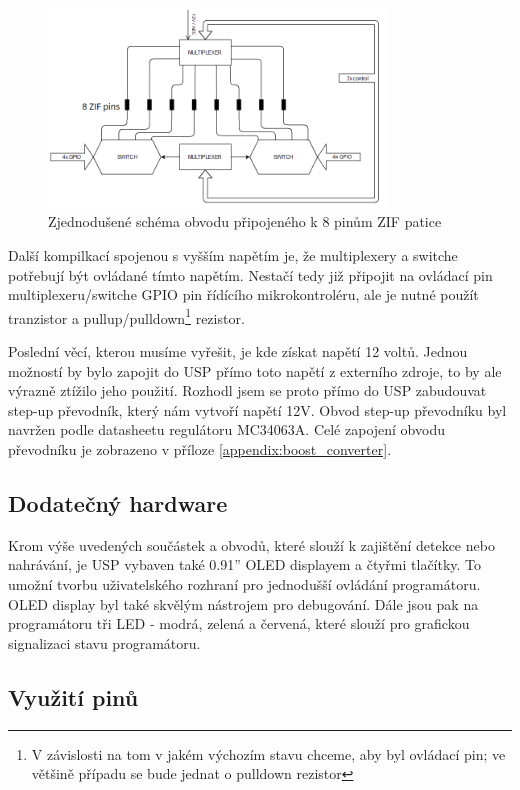 \documentclass[11pt,a4paper,twoside,openright]{report}
\begin{document}
\begin{figure}[ht!]
  \includegraphics[width=0.8\textwidth]{img/simplified_pin_switches.png}
  \centering
  \caption{Zjednodušené schéma obvodu připojeného k 8 pinům ZIF patice}
  \label{fig:simplified_pin_switches}
\end{figure}

Další kompilkací spojenou s vyšším napětím je, že multiplexery a switche potřebují být ovládané tímto napětím. Nestačí tedy již připojit na ovládací pin multiplexeru/switche GPIO pin řídícího mikrokontroléru, ale je nutné použít tranzistor a pullup/pulldown\footnote{V závislosti na tom v jakém výchozím stavu chceme, aby byl ovládací pin; ve většině případu se bude jednat o pulldown rezistor} rezistor.

Poslední věcí, kterou musíme vyřešit, je kde získat napětí 12 voltů. Jednou možností by bylo zapojit do USP přímo toto napětí z externího zdroje, to by ale výrazně ztížilo jeho použití. Rozhodl jsem se proto přímo do USP zabudouvat step-up převodník, který nám vytvoří napětí 12V. Obvod step-up převodníku byl navržen podle datasheetu regulátoru MC34063A.\cite{step-up} Celé zapojení obvodu převodníku je zobrazeno v příloze \ref{appendix:boost_converter}.

\subsection {Dodatečný hardware}

Krom výše uvedených součástek a obvodů, které slouží k zajištění detekce nebo nahrávání, je USP vybaven také 0.91'' OLED displayem a čtyřmi tlačítky. To umožní tvorbu uživatelského rozhraní pro jednodušší ovládání programátoru. OLED display byl také skvělým nástrojem pro debugování. Dále jsou pak na programátoru tři LED - modrá, zelená a červená, které slouží pro grafickou signalizaci stavu programátoru.

\subsection {Využití pinů}
\end{document}
